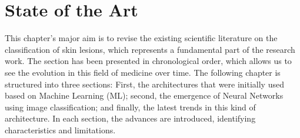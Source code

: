 \chapter{State of the Art}
\label{chapter: State of the Art}


This chapter's major aim is to revise the existing scientific literature on the classification of skin lesions, which represents a fundamental part of the research work. The section has been presented in chronological order, which allows us to see the evolution in this field of medicine over time. The following chapter is structured into three sections: First, the architectures that were initially used based on Machine Learning (ML); second, the emergence of Neural Networks using image classification; and finally, the latest trends in this kind of architecture. In each section, the advances are introduced, identifying characteristics and limitations.

